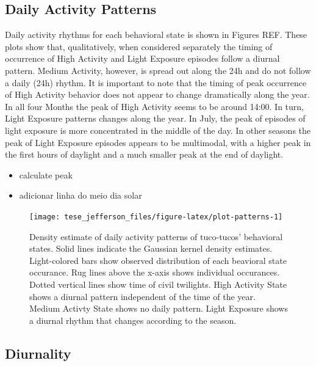 \documentclass[english,msc,numbers,hidelinks]{coppe}
\providecommand{\tightlist}{%
  \setlength{\itemsep}{0pt}\setlength{\parskip}{0pt}}
\begin{document}
  \hypertarget{daily-activity-patterns}{%
  \subsection{Daily Activity Patterns}\label{daily-activity-patterns}}

  Daily activity rhythms for each behavioral state is shown in Figures REF. These plots show that, qualitatively, when considered separately the timing of occurrence of High Activity and Light Exposure episodes follow a diurnal pattern. Medium Activity, however, is spread out along the 24h and do not follow a daily (24h) rhythm. It is important to note that the timing of peak occurrence of High Activity behavior does not appear to change dramatically along the year. In all four Months the peak of High Activity seems to be around 14:00. In turn, Light Exposure patterns changes along the year. In July, the peak of episodes of light exposure is more concentrated in the middle of the day. In other seasons the peak of Light Exposure episodes appears to be multimodal, with a higher peak in the first hours of daylight and a much smaller peak at the end of daylight.
  \begin{itemize}
  \tightlist
  \item
    calculate peak
  \item
    adicionar linha do meio dia solar
  \end{itemize}
  \begin{figure}

  {\centering \texttt{[image: tese\_jefferson\_files/figure-latex/plot-patterns-1]} 

  }

  \caption{Density estimate of daily activity patterns of tuco-tucos' behavioral states. Solid lines indicate the Gaussian kernel density estimates. Light-colored bars show observed distribution of each beavioral state occurance. Rug lines above the x-axis shows individual occurances. Dotted vertical lines show time of civil twilights. High Activity State shows a diurnal pattern independent of the time of the year. Medium Activty State shows no daily pattern. Light Exposure shows a diurnal rhythm that changes according to the season. }\label{fig:plot-patterns}
  \end{figure}
  \newpage

  \hypertarget{diurnality}{%
  \subsection{Diurnality}\label{diurnality}}
\end{document}
